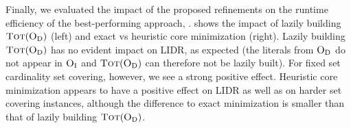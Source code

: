 Finally,
we evaluated the impact of the proposed refinements on the runtime efficiency of the best-performing approach, \msh{}.
 shows
the impact of lazily building $\textsc{Tot}(\textsc{O}_{\text{D}})$ (left) and exact vs heuristic core minimization (right).
Lazily building $\textsc{Tot}(\textsc{O}_{\text{D}})$ has no evident impact on LIDR,
as expected
(the literals from $\textsc{O}_{\text{D}}$ do not appear in $\textsc{O}_{\text{I}}$ and $\textsc{Tot}(\textsc{O}_{\text{D}})$ can therefore not be lazily built).
For fixed set cardinality set covering, however, we see a strong positive effect.
Heuristic core minimization appears to have a positive effect  on LIDR as well as on harder set covering instances,
although the difference to exact minimization is smaller
than that of lazily building $\textsc{Tot}(\textsc{O}_{\text{D}})$.
%
